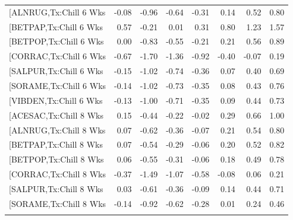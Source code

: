 \documentclass{article}\usepackage[]{graphicx}\usepackage[]{color}
\begin{document}
\begin{longtable}{lrrrrrrr}
  [ALNRUG,Tx:Chill 6 Wks & -0.08 & -0.96 & -0.64 & -0.31 & 0.14 & 0.52 & 0.80 \\ 
  [BETPAP,Tx:Chill 6 Wks & 0.57 & -0.21 & 0.01 & 0.31 & 0.80 & 1.23 & 1.57 \\ 
  [BETPOP,Tx:Chill 6 Wks & 0.00 & -0.83 & -0.55 & -0.21 & 0.21 & 0.56 & 0.89 \\ 
  [CORRAC,Tx:Chill 6 Wks & -0.67 & -1.70 & -1.36 & -0.92 & -0.40 & -0.07 & 0.19 \\ 
  [SALPUR,Tx:Chill 6 Wks & -0.15 & -1.02 & -0.74 & -0.36 & 0.07 & 0.40 & 0.69 \\ 
  [SORAME,Tx:Chill 6 Wks & -0.14 & -1.02 & -0.73 & -0.35 & 0.08 & 0.43 & 0.76 \\ 
  [VIBDEN,Tx:Chill 6 Wks & -0.13 & -1.00 & -0.71 & -0.35 & 0.09 & 0.44 & 0.73 \\ 
  [ACESAC,Tx:Chill 8 Wks & 0.15 & -0.44 & -0.22 & -0.02 & 0.29 & 0.66 & 1.00 \\ 
  [ALNRUG,Tx:Chill 8 Wks & 0.07 & -0.62 & -0.36 & -0.07 & 0.21 & 0.54 & 0.80 \\ 
  [BETPAP,Tx:Chill 8 Wks & 0.07 & -0.54 & -0.29 & -0.06 & 0.20 & 0.52 & 0.82 \\ 
  [BETPOP,Tx:Chill 8 Wks & 0.06 & -0.55 & -0.31 & -0.06 & 0.18 & 0.49 & 0.78 \\ 
  [CORRAC,Tx:Chill 8 Wks & -0.37 & -1.49 & -1.07 & -0.58 & -0.08 & 0.06 & 0.21 \\ 
  [SALPUR,Tx:Chill 8 Wks & 0.03 & -0.61 & -0.36 & -0.09 & 0.14 & 0.44 & 0.71 \\ 
  [SORAME,Tx:Chill 8 Wks & -0.14 & -0.92 & -0.62 & -0.28 & 0.01 & 0.24 & 0.46 \\ 
   \hline
\hline
\label{tab:suppmodrtos}
\end{longtable}
\end{document}
